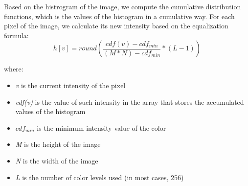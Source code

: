 \documentclass{article}
\begin{document}
	Based on the histrogram of the image, we compute the cumulative distribution functions, which is the values of the histogram in a cumulative way. For each pixel of the image, we calculate its new intensity based on the equalization formula:
			\begin{equation}
				h[v]= round \left( \frac{cdf(v)-cdf_{min}}{(M * N) - cdf_{min}} * (L-1) \right) 
			\label{eq:equalization}
			\end{equation}
			
			where:		
			\begin{itemize}
	  			\item {\it v} is the current intensity of the pixel		
		  		\item {\it cdf(v)} is the value of such intensity in the array that stores the accumulated values of the histogram
				\item {\it $cdf_{min}$} is the minimum intensity value of the color
		  		\item {\it M} is the height of the image		
		  		\item {\it N} is the width of the image
		  		\item {\it L} is the number of color levels used (in most cases, 256)
			\end{itemize}
\end{document}
